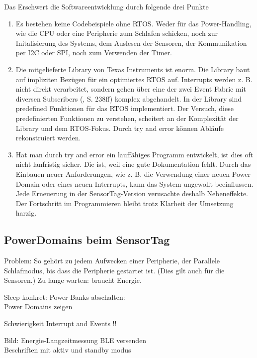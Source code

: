 
Das Erschwert die Softwareentwicklung durch folgende drei Punkte

\begin{enumerate}
    \item Es bestehen keine Codebeispiele ohne RTOS. Weder für das Power-Handling, wie die CPU oder eine Peripherie zum Schlafen schicken, noch zur Initalisierung des Systems, dem Auslesen der Sensoren, der Kommunikation per I2C oder SPI, noch zum Verwenden der Timer.
    \item Die mitgelieferte Library von Texas Instruments ist enorm. Die Library baut auf impliziten Bezügen für ein optimiertes RTOS auf. Interrupts werden z. B. nicht direkt verarbeitet, sondern gehen über eine der zwei Event Fabric mit diversen Subscribers (\cite{Sensortag_Manual}, S. 238ff) komplex abgehandelt. In der Library sind predefined Funktionen für das RTOS implementiert. Der Versuch, diese predefinierten Funktionen zu verstehen, scheitert an der Komplexität der Library und dem RTOS-Fokus. Durch try and error können Abläufe rekonstruiert werden.
   \item Hat man durch try and error ein lauffähiges Programm entwickelt, ist dies oft nicht lanfristig sicher. Die ist, weil eine gute Dokumentation fehlt. Durch das Einbauen neuer Anforderungen, wie z. B. die Verwendung einer neuen Power Domain oder eines neuen Interrupts, kann das System ungewollt beeinflussen. Jede Erneuerung in der SensorTag-Version verusachte deshalb Nebeneffekte. Der Fortschritt im Programmieren bleibt trotz Klarheit der Umsetzung harzig.
\end{enumerate}

\subsection{PowerDomains beim SensorTag}



Problem: So gehört zu jedem Aufwecken einer Peripherie, der Parallele Schlafmodus, bis dass die Peripherie gestartet ist. (Dies gilt auch für die Sensoren.) Zu lange warten: braucht Energie.

Sleep konkret: Power Banks abschalten:\\
Power Domains zeigen

Schwierigkeit Interrupt and Events !!

Bild: Energie-Langzeitmessung BLE versenden\\
Beschriften mit aktiv und standby modus


